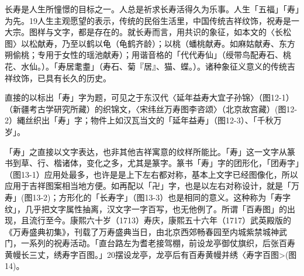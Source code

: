 
\vfill
\begin{BookNotes}
\end{BookNotes}


长寿是人生所憧憬的目标之一。人总是祈求长寿活得久为乐事。人生「五福」「寿」为先。19人生主观愿望的表示，传统的民俗生活里，中国传统吉祥纹饰，祝寿是一大宗。图样与文字，都是存在的。就长寿而言，用共识的象征，如本文的〈长松图〉以松献寿，乃至以鹤以龟（龟鹤齐龄）；以桃（蟠桃献寿。如麻姑献寿、东方朔偷桃；专用于女性的瑶池献寿）；用谐音格的「代代寿仙」（绶带鸟配寿石、桃花、水仙。）。「寿居耄耋」（寿石、菊『居』、猫、蝶。）。诸种象征义意义的传统吉祥纹饰，已具有长久的历史。

直接的以标出「寿」字为题，可见之于东汉代〈延年益寿大宜子孙锦〉（图12-1）（新疆考古学研究所藏）的织锦文，〈宋纬丝万寿图李咨颂〉（北京故宫藏）(图12-2）縄丝织出「寿」字；物件上如汉瓦当文的「延年益寿」（图12-3）、「千秋万岁」。


\vfill
\begin{BookNotes}
\end{BookNotes}


「寿」之直接以文字表达，也非其他吉祥寓意的纹样所能比。「寿」这一文字从篆书到草、行、楷诸体，变化之多，尤其是篆字。篆书「寿」字的团形化，「团寿字」（图13-1）应用处最多，也许是是上下左右都对称，基本上文字已经图像化，所以应用于吉祥图案相当地方便。如再配以「卍」字，也是以左右对称设计，就是「万寿」(图13-2)；方形化的「长寿字」（图13-3）也是相同的意义。这种称为「寿字纹」，几乎把文字属性抽离，汉文字一字百写，也无他例了。所谓「百寿图」的出现，且流行至今。康熙六十岁（1713）寿庆，康熙五十六年（1717）武英殿版的《万寿盛典初集》，刊载了万寿盛典当日，由北京西郊畅春园至内城紫禁城神武门，一系列的祝寿活动。「直台路左为耆老接驾棚，前设龙亭御仗旗织，后张百寿黄幔长三丈，绣寿字百图。」20摆设龙亭，龙亭后有百寿黄幔并绣〈寿字百图>(图14)。

